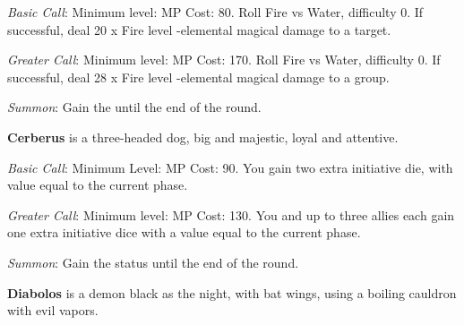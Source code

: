 \begin{multicols}{2}
    \textit{Basic Call}: Minimum level:  MP Cost: 80. Roll Fire vs Water, difficulty 0. If successful, deal 20 x Fire level -elemental magical damage to a target.
    
    \textit{Greater Call}: Minimum level:  MP Cost: 170. Roll Fire vs Water, difficulty 0. If successful, deal 28 x Fire level -elemental magical damage to a group.
    
    \textit{Summon}: Gain the  until the end of the round.

    \ffcrystal[type=level,height=8pt]
    
    \textbf{Cerberus} is a three-headed dog, big and majestic, loyal and attentive.
    
    \textit{Basic Call}: Minimum Level:  MP Cost: 90. You gain two extra initiative die, with value equal to the current phase.
    
    \textit{Greater Call}: Minimum level:  MP Cost: 130. You and up to three allies each gain one extra initiative dice with a value equal to the current phase.
    
    \textit{Summon}: Gain the  status until the end of the round.

    \ffcrystal[type=level,height=8pt]
    
    \textbf{Diabolos} is a demon black as the night, with bat wings, using a boiling cauldron with evil vapors.
    

\end{multicols}
